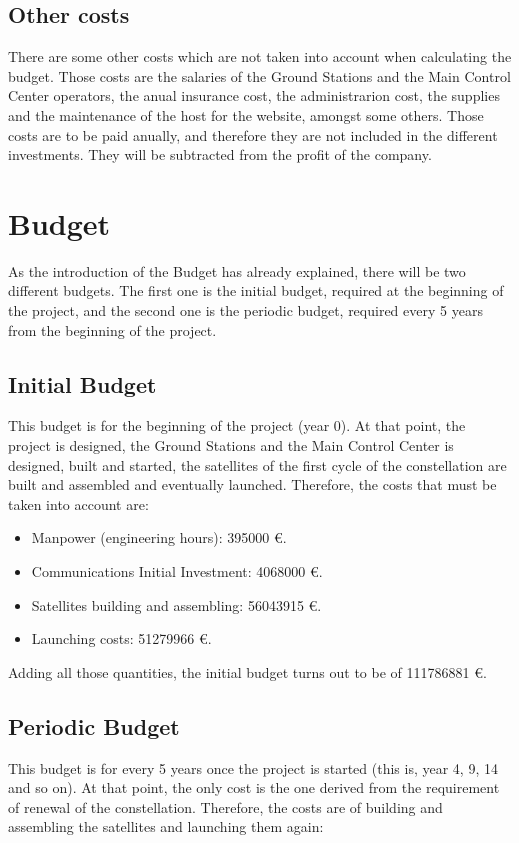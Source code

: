 \section{Other costs}

There are some other costs which are not taken into account when calculating the budget. Those costs are the salaries of the Ground Stations and the Main Control Center operators, the anual insurance cost, the administrarion cost, the supplies and the  maintenance of the host for the website, amongst some others. Those costs are to be paid anually, and therefore they are not included in the different investments. They will be subtracted from the profit of the company. 



\chapter{Budget}
As the introduction of the Budget has already explained, there will be two different budgets. The first one is the initial budget, required at the beginning of the project, and the second one is the periodic budget, required every 5 years from the beginning of the project.

\section{Initial Budget}
This budget is for the beginning of the project (year 0). At that point, the project is designed, the Ground Stations and the Main Control Center is designed, built and started, the satellites of the first cycle of the constellation are built and assembled and eventually launched. Therefore, the costs that must be taken into account are:
\begin{itemize}
\item Manpower (engineering hours): 395000 \euro .
\item Communications Initial Investment: 4068000 \euro .
\item Satellites building and assembling: 56043915 \euro .
\item Launching costs: 51279966 \euro .
\end{itemize}

Adding all those quantities, the initial budget turns out to be of 111786881 \euro. 

\section{Periodic Budget}
This budget is for every 5 years once the project is started (this is, year 4, 9, 14 and so on). At that point, the only cost is the one derived from the requirement of renewal of the constellation. Therefore, the costs are of building and assembling the satellites and launching them again:

